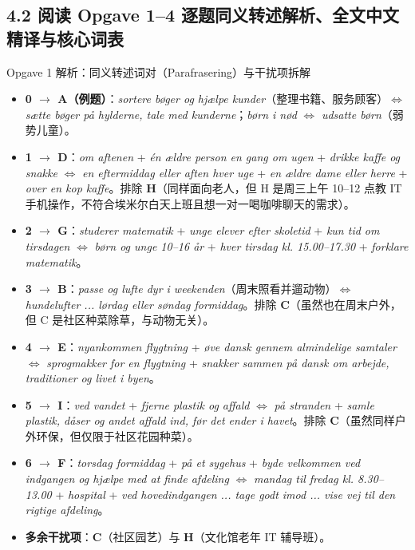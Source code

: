 \subsection*{4.2 阅读 Opgave 1--4 逐题同义转述解析、全文中文精译与核心词表}

\begin{tipbox}{Opgave 1 解析：同义转述词对（Parafrasering）与干扰项拆解}
\small
\begin{itemize}
  \item \textbf{0 $\rightarrow$ A（例题）}：\textit{sortere bøger og hjælpe kunder}（整理书籍、服务顾客）$\Leftrightarrow$ \textit{sætte bøger på hylderne, tale med kunderne}；\textit{børn i nød} $\Leftrightarrow$ \textit{udsatte børn}（弱势儿童）。
  \item \textbf{1 $\rightarrow$ D}：\textit{om aftenen} + \textit{én ældre person en gang om ugen} + \textit{drikke kaffe og snakke} $\Leftrightarrow$ \textit{en eftermiddag eller aften hver uge} + \textit{en ældre dame eller herre} + \textit{over en kop kaffe}。排除 \textbf{H}（同样面向老人，但 H 是周三上午 10--12 点教 IT 手机操作，不符合埃米尔白天上班且想一对一喝咖啡聊天的需求）。
  \item \textbf{2 $\rightarrow$ G}：\textit{studerer matematik} + \textit{unge elever efter skoletid} + \textit{kun tid om tirsdagen} $\Leftrightarrow$ \textit{børn og unge 10--16 år} + \textit{hver tirsdag kl. 15.00--17.30} + \textit{forklare matematik}。
  \item \textbf{3 $\rightarrow$ B}：\textit{passe og lufte dyr i weekenden}（周末照看并遛动物）$\Leftrightarrow$ \textit{hundelufter ... lørdag eller søndag formiddag}。排除 \textbf{C}（虽然也在周末户外，但 C 是社区种菜除草，与动物无关）。
  \item \textbf{4 $\rightarrow$ E}：\textit{nyankommen flygtning} + \textit{øve dansk gennem almindelige samtaler} $\Leftrightarrow$ \textit{sprogmakker for en flygtning} + \textit{snakker sammen på dansk om arbejde, traditioner og livet i byen}。
  \item \textbf{5 $\rightarrow$ I}：\textit{ved vandet} + \textit{fjerne plastik og affald} $\Leftrightarrow$ \textit{på stranden} + \textit{samle plastik, dåser og andet affald ind, før det ender i havet}。排除 \textbf{C}（虽然同样户外环保，但仅限于社区花园种菜）。
  \item \textbf{6 $\rightarrow$ F}：\textit{torsdag formiddag} + \textit{på et sygehus} + \textit{byde velkommen ved indgangen og hjælpe med at finde afdeling} $\Leftrightarrow$ \textit{mandag til fredag kl. 8.30--13.00} + \textit{hospital} + \textit{ved hovedindgangen ... tage godt imod ... vise vej til den rigtige afdeling}。
  \item \textbf{多余干扰项}：\textbf{C}（社区园艺）与 \textbf{H}（文化馆老年 IT 辅导班）。
\end{itemize}
\end{tipbox}

